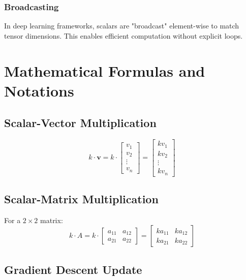 \documentclass[11pt,a4paper]{article}
\begin{document}
\subsubsection{Broadcasting}

In deep learning frameworks, scalars are "broadcast" element-wise to match tensor dimensions. This enables efficient computation without explicit loops.

\section{Mathematical Formulas and Notations}

\subsection{Scalar-Vector Multiplication}

\begin{equation}
    k \cdot \mathbf{v} = k \cdot \begin{bmatrix} v_1 \\ v_2 \\ \vdots \\ v_n \end{bmatrix} = \begin{bmatrix} k v_1 \\ k v_2 \\ \vdots \\ k v_n \end{bmatrix}
\end{equation}

\subsection{Scalar-Matrix Multiplication}

For a $2 \times 2$ matrix:
\begin{equation}
    k \cdot A = k \cdot \begin{bmatrix} a_{11} & a_{12} \\ a_{21} & a_{22} \end{bmatrix} = \begin{bmatrix} k a_{11} & k a_{12} \\ k a_{21} & k a_{22} \end{bmatrix}
\end{equation}

\subsection{Gradient Descent Update}
\end{document}

